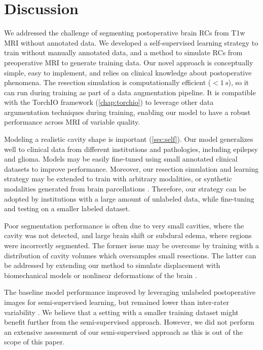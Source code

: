 \section{Discussion}
\label{sec:resections_discussion}

We addressed the challenge of segmenting postoperative brain \acp{RC} from \ac{T1w} \ac{MRI} without annotated data.
We developed a self-supervised learning strategy to train without manually annotated data, and a method to simulate \acp{RC} from preoperative \ac{MRI} to generate training data.
Our novel approach is conceptually simple, easy to implement, and relies on clinical knowledge about postoperative phenomena.
The resection simulation is computationally efficient ($< \SI{1}{\second}$), so it can run during training as part of a data augmentation pipeline.
It is compatible with the TorchIO framework \cite{perez-garcia_torchio_2021} (\cref{chap:torchio}) to leverage other data argumentation techniques during training, enabling our model to have a robust performance across \ac{MRI} of variable quality.

Modeling a realistic cavity shape is important (\cref{sec:self}).
Our model generalizes well to clinical data from different institutions and pathologies, including epilepsy and glioma.
Models may be easily fine-tuned using small annotated clinical datasets to improve performance.
Moreover, our resection simulation and learning strategy may be extended to train with arbitrary modalities, or synthetic modalities generated from brain parcellations \cite{billot_learning_2020}.
Therefore, our strategy can be adopted by institutions with a large amount of unlabeled data, while fine-tuning and testing on a smaller labeled dataset.

Poor segmentation performance is often due to very small cavities, where the cavity was not detected, and large brain shift or subdural edema, where regions were incorrectly segmented.
The former issue may be overcome by training with a distribution of cavity volumes which oversamples small resections.
The latter can be addressed by extending our method to simulate displacement with biomechanical models or nonlinear deformations of the brain \cite{granados_generative_2021}.

The baseline model performance improved by leveraging unlabeled postoperative images for semi-supervised learning, but remained lower than inter-rater variability \cite{perez-garcia_simulation_2020}.  %
We believe that a setting with a smaller training dataset might benefit further from the semi-supervised approach.
However, we did not perform an extensive assessment of our semi-supervised approach as this is out of the scope of this paper.

